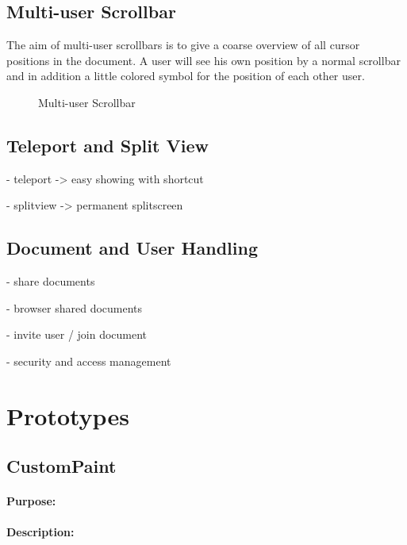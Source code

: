 \documentclass[11pt,a4paper]{article}
\begin{document}
\subsection{Multi-user Scrollbar}
The aim of multi-user scrollbars is to give a coarse overview of all cursor positions in the document. A user will see his own position by a normal scrollbar and in addition a little colored symbol for the position of each other user.
\begin{figure}[H]
\centering
{}
\caption{Multi-user Scrollbar}
\end{figure}

\subsection{Teleport and Split View}
- teleport -> easy showing with shortcut

- splitview -> permanent splitscreen

\subsection{Document and User Handling}
- share documents

- browser shared documents

- invite user / join document

- security and access management


\section{Prototypes}
\subsection{CustomPaint}
\paragraph{Purpose:}
\paragraph{Description:}
\end{document}
